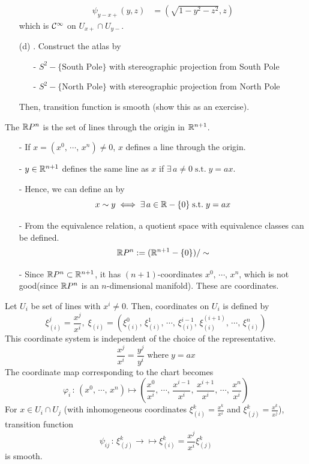 \documentclass[a4paper, 10pt]{article}
\begin{document}
\begin{example}
\begin{itemize}
\begin{align*}
            \psi_{y-x+}(y,z) &= (\sqrt{1-y^{2}-z^{2}},z)
        \end{align*}
        which is $\mathcal{C}^{\infty}$ on $U_{x+} \cap U_{y-}$.
        \item[(d)] . Construct the atlas by
        \begin{itemize}
            \item[-] $S^{2}-\{\text{South Pole}\}$ with stereographic projection from South Pole
            \item[-] $S^{2}-\{\text{North Pole}\}$ with stereographic projection from North Pole
        \end{itemize}
        Then, transition function is smooth (show this as an exercise).
    \end{itemize}
\end{example}

\seprule

\begin{example}
    The  $\mathbb{R}P^{n}$ is the set of lines through the origin in $\mathbb{R}^{n+1}$.
    \begin{itemize}
        \item[-] If $x = (x^{0},\, \cdots,\, x^{n}) \neq 0$, $x$ defines a line through the origin.
        \item[-] $y \in \mathbb{R}^{n+1}$ defines the same line as $x$ if $\exists\,a\neq 0\;\text{s.t.}\;y=ax$.
        \item[-] Hence, we can define an  by
        \[ x\sim y \;\Longleftrightarrow\; \exists\,a\in\mathbb{R}-\{0\}\;\text{s.t.}\;y=ax \]
        \item[-] From the equivalence relation, a quotient space with equivalence classes can be defined.
        \[ \mathbb{R}P^{n} := (\mathbb{R}^{n+1}-\{0\})/\sim \]
        \item[-] Since $\mathbb{R}P^{n} \subset \mathbb{R}^{n+1}$, it has $(n+1)$-coordinates $x^{0},\,\cdots,\,x^{n}$, which is not good(since $\mathbb{R}P^{n}$ is an $n$-dimensional manifold). These are  coordinates.
    \end{itemize}
    Let $U_{i}$ be set of lines with $x^{i} \neq 0$. Then,  coordinates on $U_{i}$ is defined by
    \[ \xi_{(i)}^{j} = \frac{x^{j}}{x^{i}},\; \xi_{(i)} = (\xi_{(i)}^{0},\,\xi_{(i)}^{1},\,\cdots,\,\xi_{(i)}^{i-1},\,\xi_{(i)}^{(i+1)},\,\cdots,\,\xi_{(i)}^{n}) \]
    This coordinate system is independent of the choice of the representative.
    \[ \frac{x^{j}}{x^{i}} = \frac{y^{j}}{y^{i}} \;\text{where}\;y = ax \]
    The coordinate map corresponding to the chart becomes
    \[ \varphi_{i} \,:\, (x^{0},\,\cdots,\,x^{n}) \mapsto (\frac{x^{0}}{x^{i}},\,\cdots,\,\frac{x^{i-1}}{x^{i}},\,\frac{x^{i+1}}{x^{i}},\,\cdots,\,\frac{x^{n}}{x^{i}}) \]
    For $x \in U_{i} \cap U_{j}$ (with inhomogeneous coordinates $\xi_{(i)}^{k} = \frac{x^{k}}{x^{i}}$ and $\xi_{(j)}^{k} = \frac{x^{k}}{x^{j}}$), transition function
    \[ \psi_{ij} \,:\, \xi_{(j)}^{k} \rightarrow \mapsto \xi_{(i)}^{k} = \frac{x^{j}}{x^{i}}\xi_{(j)}^{k} \]
    is smooth.
\end{example}
\end{document}
